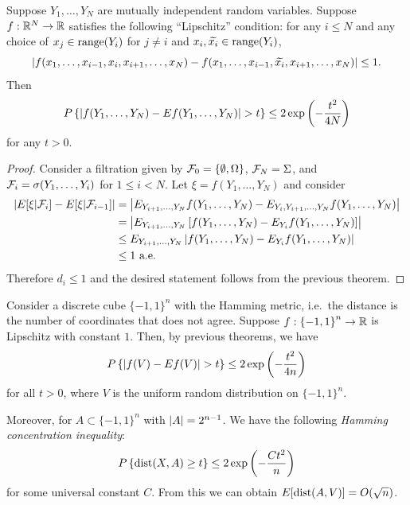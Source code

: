 \documentclass[a4paper]{article}
\begin{document}
\begin{cor}
  Suppose $Y_1, \dots, Y_N$ are mutually independent random 
  variables. Suppose $f : \mathbb{R}^N \to \mathbb{R}$ satisfies the 
  following ``Lipschitz'' condition: for any 
  $i \leq N$ and any choice of $x_j \in \operatorname{range} (Y_i)$ 
  for $j \neq i$ and $x_i, \widetilde{x_i} \in \operatorname{range} (Y_i)$, 
  \[
  \left\lvert f(x_1, \dots, x_{i - 1}, x_i,
  x_{i + 1}, \dots, x_N) - f(x_1, \dots, x_{i - 1}, \widetilde{x_i}, 
  x_{i + 1}, \dots, x_N)\right\rvert \leq 1.
  \]
  Then 
  \[
  P \left\{ \left\lvert f(Y_1, \dots, Y_N) - E f(Y_1, \dots, Y_N)\right\rvert > t \right\}
  \leq 2 \exp \left( - \frac{t^2}{4 N} \right)
  \]
  for any $t > 0$.
\end{cor}

\begin{proof}
  Consider a filtration given by $\mathcal{F}_0 = \{ \emptyset, \Omega \}$,
  $\mathcal{F}_N = \Sigma$, and $\mathcal{F}_i = \sigma(Y_1, \dots, Y_i)$ 
  for $1 \leq i < N$. Let $\xi = f (Y_1, \dots, Y_N)$ and consider 
  \begin{align*}
    \left\lvert E [\xi | \mathcal{F}_i] - E [\xi | \mathcal{F}_{i - 1}]\right\rvert
    &= \left\lvert E_{Y_{i+1}, \dots, Y_N} f(Y_1, \dots, Y_N)
    - E_{Y_i, Y_{i+1}, \dots, Y_N} f(Y_1, \dots, Y_N)\right\rvert \\
    &= \left\lvert E_{Y_{i+1}, \dots, Y_N}
    \left[ f(Y_1, \dots, Y_N) - E_{Y_i} f(Y_1, \dots, Y_N) \right]\right\rvert \\
    &\leq E_{Y_{i+1}, \dots, Y_N}
    \left\lvert  f(Y_1, \dots, Y_N) - E_{Y_i} f(Y_1, \dots, Y_N) \right\rvert \\
    &\leq 1 \text{ a.e.}
  \end{align*}
  Therefore $d_i \leq 1$ and the desired statement follows from the 
  previous theorem.

\end{proof}

\begin{eg}
  Consider a discrete cube $\{-1, 1\}^n$ with the Hamming metric, i.e.\
  the distance is the number of coordinates that does not agree.
  Suppose $f : \left\{ -1, 1 \right\}^n \to \mathbb{R}$ is Lipschitz
  with constant $1$. Then, by previous theorems, we have
  \[
  P \left\{ \left\lvert f(V) - E f(V)\right\rvert > t \right\} 
  \leq 2 \exp \left( - \frac{t^2}{4 n} \right)
  \]
  for all $t > 0$, where $V$ is the uniform random distribution 
  on $\{ -1, 1 \}^n$. 

  Moreover, for $A \subset \{-1, 1\}^n$ with $\left\lvert A\right\rvert = 2^{n - 1}$.
  We have the following \emph{Hamming concentration inequality}:
  \[
  P \left\{ \operatorname{dist}(X, A) \geq t \right\}
  \leq 2 \exp \left( - \frac{C t^2}{n} \right)
  \]
  for some universal constant $C$.
  From this we can obtain $E [\operatorname{dist} (A, V)] = O(\sqrt{n})$. 
\end{eg}
\end{document}
